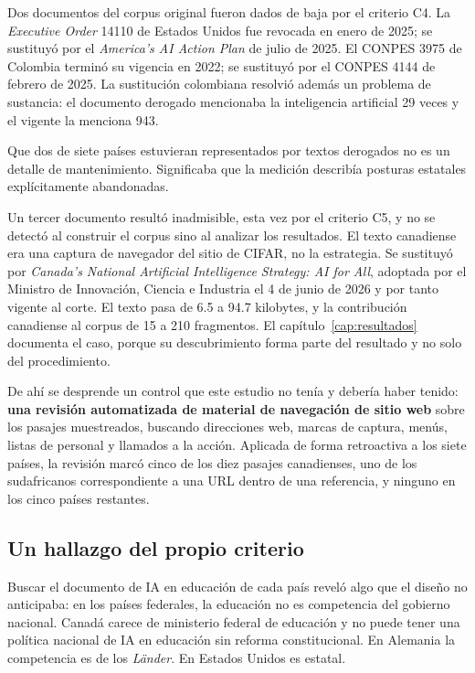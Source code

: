 Dos documentos del corpus original fueron dados de baja por el criterio C4. La \textit{Executive Order} 14110 de Estados Unidos fue revocada en enero de 2025; se sustituyó por el \textit{America's AI Action Plan} de julio de 2025. El CONPES 3975 de Colombia terminó su vigencia en 2022; se sustituyó por el CONPES 4144 de febrero de 2025. La sustitución colombiana resolvió además un problema de sustancia: el documento derogado mencionaba la inteligencia artificial 29 veces y el vigente la menciona 943.

Que dos de siete países estuvieran representados por textos derogados no es un detalle de mantenimiento. Significaba que la medición describía posturas estatales explícitamente abandonadas.

Un tercer documento resultó inadmisible, esta vez por el criterio C5, y no se detectó al construir el corpus sino al analizar los resultados. El texto canadiense era una captura de navegador del sitio de CIFAR, no la estrategia. Se sustituyó por \textit{Canada's National Artificial Intelligence Strategy: AI for All}, adoptada por el Ministro de Innovación, Ciencia e Industria el 4 de junio de 2026 y por tanto vigente al corte. El texto pasa de 6.5 a 94.7 kilobytes, y la contribución canadiense al corpus de 15 a 210 fragmentos. El capítulo~\ref{cap:resultados} documenta el caso, porque su descubrimiento forma parte del resultado y no solo del procedimiento.

De ahí se desprende un control que este estudio no tenía y debería haber tenido: \textbf{una revisión automatizada de material de navegación de sitio web} sobre los pasajes muestreados, buscando direcciones web, marcas de captura, menús, listas de personal y llamados a la acción. Aplicada de forma retroactiva a los siete países, la revisión marcó cinco de los diez pasajes canadienses, uno de los sudafricanos correspondiente a una URL dentro de una referencia, y ninguno en los cinco países restantes.

\subsection{Un hallazgo del propio criterio}

Buscar el documento de IA en educación de cada país reveló algo que el diseño no anticipaba: en los países federales, la educación no es competencia del gobierno nacional. Canadá carece de ministerio federal de educación y no puede tener una política nacional de IA en educación sin reforma constitucional. En Alemania la competencia es de los \textit{Länder}. En Estados Unidos es estatal.


